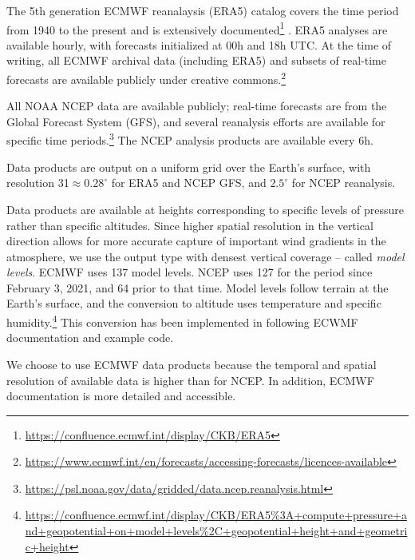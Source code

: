 \documentclass[twocolumn]{aastex631}
\begin{document}
The 5th generation ECMWF reanalaysis (ERA5) catalog covers the time period from 1940 to the present and is extensively documented\footnote{\url{https://confluence.ecmwf.int/display/CKB/ERA5}} \citep{hersbach_era5_2020}.
ERA5 analyses are available hourly, with forecasts initialized at 00h and 18h UTC.
At the time of writing, all ECMWF archival data (including ERA5) and subsets of real-time forecasts are available publicly under creative commons.\footnote{\url{https://www.ecmwf.int/en/forecasts/accessing-forecasts/licences-available}}

All NOAA NCEP data are available publicly; real-time forecasts are from the Global Forecast System (GFS), and several reanalysis efforts are available for specific time periods.\footnote{\url{https://psl.noaa.gov/data/gridded/data.ncep.reanalysis.html}}
The NCEP analysis products are available every 6h.

Data products are output on a uniform grid over the Earth's surface, with resolution 31\km $\approx 0.28^\circ$ for ERA5 and NCEP GFS, and $2.5^\circ$ for NCEP reanalysis.

Data products are available at heights corresponding to specific levels of pressure rather than specific altitudes.
Since higher spatial resolution in the vertical direction allows for more accurate capture of important wind gradients in the atmosphere, we use the output type with densest vertical coverage -- called \textit{model levels}. 
ECMWF uses 137 model levels. 
NCEP uses 127 for the period since February 3, 2021, and 64 prior to that time.
Model levels follow terrain at the Earth's surface, and the conversion to altitude uses temperature and specific humidity.\footnote{\url{https://confluence.ecmwf.int/display/CKB/ERA5\%3A+compute+pressure+and+geopotential+on+model+levels\%2C+geopotential+height+and+geometric+height}}
This conversion has been implemented in \psfws following ECWMF documentation and example code.

We choose to use ECMWF data products because the temporal and spatial resolution of available data is higher than for NCEP.
In addition, ECMWF documentation is more detailed and accessible.

{}



\end{document}
